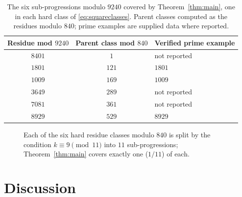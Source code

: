 \documentclass[11pt,a4paper]{article}
\theoremstyle{definition}
\begin{document}
\begin{table}[t]
  \centering
  \begin{tabular}{ccl}
    \toprule
    Residue mod $9240$ & Parent class mod $840$ & Verified prime example \\
    \midrule
    $8401$ & $1$   & not reported \\
    $1801$ & $121$ & $1801$ \\
    $1009$ & $169$ & $1009$ \\
    $3649$ & $289$ & not reported \\
    $7081$ & $361$ & not reported \\
    $8929$ & $529$ & $8929$ \\
    \bottomrule
  \end{tabular}
  \caption{The six sub-progressions modulo $9240$ covered by
    Theorem~\ref{thm:main}, one in each hard class of
    \eqref{eq:squareclasses}. Parent classes computed as the residues
    modulo $840$; prime examples are supplied data where reported.}
  \label{tab:subfamilies}
\end{table}

\begin{figure}[t]
  \centering
  \caption{Each of the six hard residue classes modulo $840$ is split by
    the condition $k \equiv 9 \pmod{11}$ into $11$ sub-progressions;
    Theorem~\ref{thm:main} covers exactly one ($1/11$) of each.}
  \label{fig:coverage}
\end{figure}

\section{Discussion}
\end{document}
